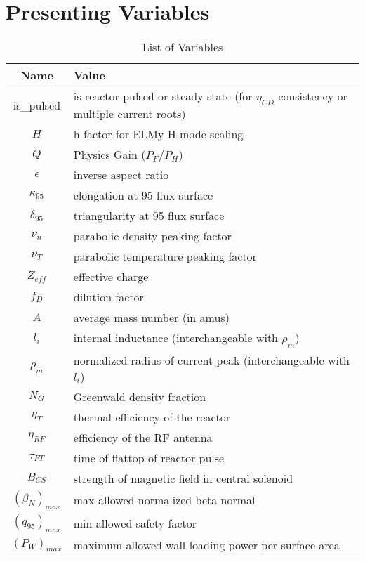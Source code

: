 \chapter{Presenting  Variables}
\begin{table}[h]
\caption{List of  Variables}
\begin{tabular}{c|l}
\textbf{Name} & \textbf{Value} \\
\hline
is\_pulsed & is reactor pulsed or steady-state (for $\eta_{CD}$ consistency or multiple current roots) \\
$H$ & h factor for ELMy H-mode scaling \\
$Q$ & Physics Gain ($P_F/P_H$) \\
$\epsilon$ & inverse aspect ratio \\
$\kappa_{95}$ &  elongation at 95 flux surface \\
$\delta_{95}$ &  triangularity at 95 flux surface \\
$\nu_n$ &  parabolic density peaking factor \\
$\nu_T$ &  parabolic temperature peaking factor \\
$Z_{eff}$ & effective charge \\
$f_D$ & dilution factor \\
$A$ & average mass number (in amus) \\
$l_i$ & internal inductance (interchangeable with $\rho_m$) \\
$\rho_m$ & normalized radius of current peak (interchangeable with $l_i$) \\
$N_G$ & Greenwald density fraction \\
$\eta_T$ & thermal efficiency of the reactor \\
$\eta_{RF}$ &  efficiency of the RF antenna \\
$\tau_{FT}$ &  time of flattop of reactor pulse \\
$B_{CS}$ &  strength of magnetic field in central solenoid \\
$(\beta_N)_{max}$ &  max allowed normalized beta normal \\
$(q_{95})_{max}$ &  min allowed safety factor \\
$(P_W)_{max}$ & maximum allowed wall loading power per surface area
\end{tabular}
\end{table}

